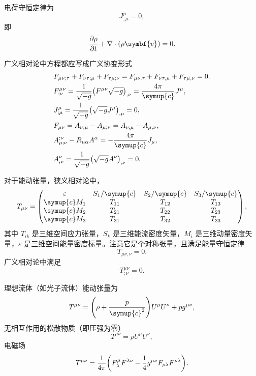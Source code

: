 \documentclass[UTF8, 12pt, a4paper, oneside, onecolumn, fontset=none]{ctexart}
\begin{document}
电荷守恒定律为
\begin{equation}
J^{\mu}_{,\mu}=0,
\end{equation}
即
\begin{equation}
\frac{\partial\rho}{\partial{}t}+\nabla\cdot\mleft(\rho\symbf{v}\mright)=0.
\end{equation}

广义相对论中方程都应写成广义协变形式
\begin{align}
&F_{\mu\nu;\tau}+F_{\nu\tau;\mu}+F_{\tau\mu;\nu}=F_{\mu\nu,\tau}+F_{\nu\tau,\mu}+F_{\tau\mu,\nu}=0.\\
&F^{\mu\nu}_{;\nu}=\frac{1}{\sqrt{-g}}\mleft(F^{\mu\nu}\sqrt{-g}\mright)_{,\nu}=\frac{4\pi}{\symup{c}}J^{\mu},\\
&J^{\mu}_{;\mu}=\frac{1}{\sqrt{-g}}\mleft(\sqrt{-g}J^{\mu}\mright)_{,\mu}=0,\\
&F_{\mu\nu}=A_{\nu;\mu}-A_{\mu;\nu}=A_{\nu,\mu}-A_{\mu,\nu},\\
&A_{\mu;\nu}^{;\nu}-R_{\mu\alpha}A^{\alpha}=-\frac{4\pi}{\symup{c}}J_{\mu},\\
&A^{\nu}_{;\nu}=\frac{1}{\sqrt{-g}}\mleft(\sqrt{-g}A^{\nu}\mright)_{,\nu}=0.
\end{align}

对于能动张量，狭义相对论中，
\begin{equation}
T_{\mu\nu}=\begin{pmatrix}
\varepsilon & S_{1}/\symup{c} & S_{2}/\symup{c} & S_{3}/\symup{c}\\
\symup{c}M_{1} & T_{11} & T_{12} & T_{13}\\
\symup{c}M_{2} & T_{21} & T_{22} & T_{23}\\
\symup{c}M_{3} & T_{31} & T_{32} & T_{33}\\
\end{pmatrix},
\end{equation}
其中 $T_{ik}$ 是三维空间应力张量，$S_{k}$ 是三维能流密度矢量，$M_{i}$ 是三维动量密度矢量，$\varepsilon$ 是三维空间能量密度标量。注意它是个对称张量，且满足能量守恒定律
\begin{equation}
T_{\mu\nu,\nu}=0.
\end{equation}
广义相对论中满足
\begin{equation}
T^{\mu\nu}_{;\nu}=0.
\end{equation}

理想流体（如光子流体）能动张量为
\begin{equation}
T^{\mu\nu}=\mleft(\rho+\frac{p}{\symup{c}^{2}}\mright) U^{\mu}U^{\nu}+pg^{\mu\nu},
\end{equation}
无相互作用的松散物质（即压强为零）
\begin{equation}
T^{\mu\nu}=\rho U^{\mu}U^{\nu},
\end{equation}
电磁场
\begin{equation}
T^{\mu\nu}=\frac{1}{4\pi}\mleft(F_{\lambda}^{\mu}F^{\lambda\nu}-\frac{1}{4}g^{\mu\nu}F_{\rho\lambda}F^{\rho\lambda}\mright).
\end{equation}
\end{document}
